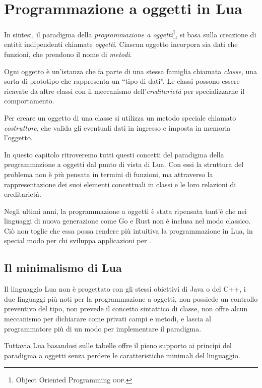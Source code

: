 
\chapter{Programmazione a oggetti in Lua}
\label{iiChOop}

In sintesi, il paradigma della \emph{programmazione a oggetti}\footnote{Object
Oriented Programming \textsc{oop}.}, si basa sulla creazione di entità
indipendenti chiamate \emph{oggetti}. Ciascun oggetto incorpora sia dati che
funzioni, che prendono il nome di \emph{metodi}.

Ogni oggetto è un'istanza che fa parte di una stessa famiglia chiamata
\emph{classe}, una sorta di prototipo che rappresenta un ``tipo di dati''. Le
classi possono essere ricavate da altre classi con il meccanismo
dell'\emph{ereditarietà} per specializzarne il comportamento.

Per creare un oggetto di una classe si utilizza un metodo speciale chiamato
\emph{costruttore}, che valida gli eventuali dati in ingresso e imposta in
memoria l'oggetto.

In questo capitolo ritroveremo tutti questi concetti del paradigma della
programmazione a oggetti dal punto di vista di Lua. Con essi la struttura del
problema non è più pensata in termini di funzioni, ma attraverso la
rappresentazione dei suoi elementi concettuali in classi e le loro relazioni di
ereditarietà.

Negli ultimi anni, la programmazione a oggetti è stata ripensata tant'è che nei
linguaggi di nuova generazione come Go e Rust non è inclusa nel modo classico.
Ciò non toglie che essa possa rendere più intuitiva la programmazione in Lua, in
special modo per chi sviluppa applicazioni per \LuaTeX.


\section{Il minimalismo di Lua}

Il linguaggio Lua non è progettato con gli stessi obiettivi di Java o del C++, i
due linguaggi più noti per la programmazione a oggetti, non possiede un
controllo preventivo del tipo, non prevede il concetto sintattico di classe, non
offre alcun meccanismo per dichiarare come privati campi e metodi, e lascia al
programmatore più di un modo per implementare il paradigma.

Tuttavia Lua basandosi sulle tabelle offre il pieno supporto ai principi del
paradigma a oggetti senza perdere le caratteristiche minimali del linguaggio.


